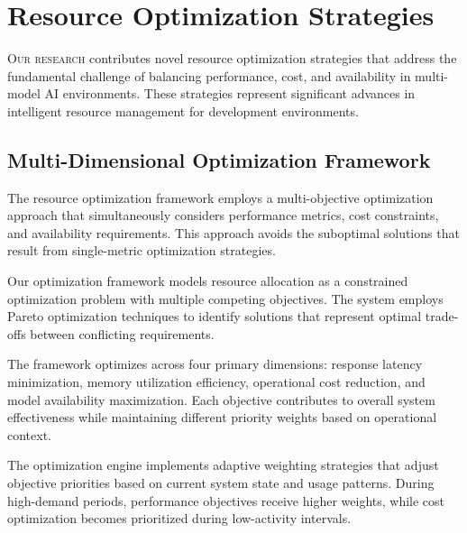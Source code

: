 
\section*{Resource Optimization Strategies}

\lettrine{O}{ur research} contributes novel resource optimization strategies that address the fundamental challenge of balancing performance, cost, and availability in multi-model AI environments. These strategies represent significant advances in intelligent resource management for development environments.

\subsection*{Multi-Dimensional Optimization Framework}

The resource optimization framework employs a multi-objective optimization approach that simultaneously considers performance metrics, cost constraints, and availability requirements. This approach avoids the suboptimal solutions that result from single-metric optimization strategies.

Our optimization framework models resource allocation as a constrained optimization problem with multiple competing objectives. The system employs Pareto optimization techniques to identify solutions that represent optimal trade-offs between conflicting requirements.

\begin{infobox}[title=Optimization Objectives]
The framework optimizes across four primary dimensions: response latency minimization, memory utilization efficiency, operational cost reduction, and model availability maximization. Each objective contributes to overall system effectiveness while maintaining different priority weights based on operational context.
\end{infobox}

The optimization engine implements adaptive weighting strategies that adjust objective priorities based on current system state and usage patterns. During high-demand periods, performance objectives receive higher weights, while cost optimization becomes prioritized during low-activity intervals.

